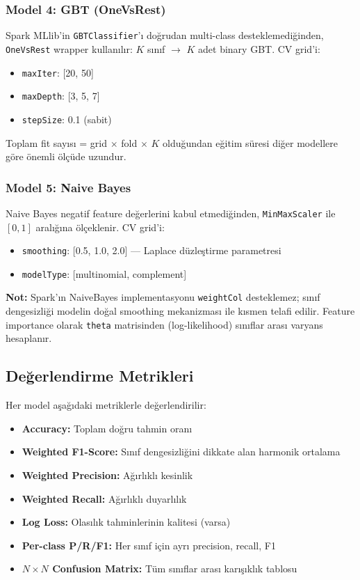 \documentclass[12pt,a4paper]{article}
\begin{document}
\subsubsection{Model 4: GBT (OneVsRest)}
Spark MLlib'in \texttt{GBTClassifier}'ı doğrudan multi-class desteklemediğinden, \texttt{OneVsRest} wrapper kullanılır: $K$ sınıf $\to$ $K$ adet binary GBT. CV grid'i:
\begin{itemize}[noitemsep]
  \item \texttt{maxIter}: [20, 50]
  \item \texttt{maxDepth}: [3, 5, 7]
  \item \texttt{stepSize}: 0.1 (sabit)
\end{itemize}
Toplam fit sayısı = grid $\times$ fold $\times$ $K$ olduğundan eğitim süresi diğer modellere göre önemli ölçüde uzundur.

\subsubsection{Model 5: Naive Bayes}
Naive Bayes negatif feature değerlerini kabul etmediğinden, \texttt{MinMaxScaler} ile $[0,1]$ aralığına ölçeklenir. CV grid'i:
\begin{itemize}[noitemsep]
  \item \texttt{smoothing}: [0.5, 1.0, 2.0] — Laplace düzleştirme parametresi
  \item \texttt{modelType}: [multinomial, complement]
\end{itemize}
\textbf{Not:} Spark'ın NaiveBayes implementasyonu \texttt{weightCol} desteklemez; sınıf dengesizliği modelin doğal smoothing mekanizması ile kısmen telafi edilir. Feature importance olarak \texttt{theta} matrisinden (log-likelihood) sınıflar arası varyans hesaplanır.

\subsection{Değerlendirme Metrikleri}
Her model aşağıdaki metriklerle değerlendirilir:
\begin{itemize}[noitemsep]
  \item \textbf{Accuracy:} Toplam doğru tahmin oranı
  \item \textbf{Weighted F1-Score:} Sınıf dengesizliğini dikkate alan harmonik ortalama
  \item \textbf{Weighted Precision:} Ağırlıklı kesinlik
  \item \textbf{Weighted Recall:} Ağırlıklı duyarlılık
  \item \textbf{Log Loss:} Olasılık tahminlerinin kalitesi (varsa)
  \item \textbf{Per-class P/R/F1:} Her sınıf için ayrı precision, recall, F1
  \item \textbf{$N \times N$ Confusion Matrix:} Tüm sınıflar arası karışıklık tablosu
\end{itemize}
\end{document}
